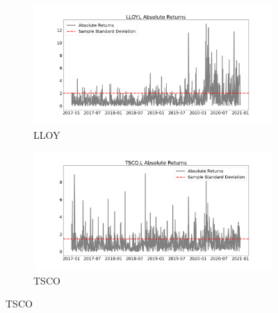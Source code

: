 \begin{figure}[hbt!]

\begin{subfigure}{.49\linewidth}
  \includegraphics[width=\linewidth]{images/Exploratory/plot 1.png}
  \caption{LLOY}
  \label{A}
\end{subfigure} %
\begin{subfigure}{.49\linewidth}
  \includegraphics[width=\linewidth]{images/Exploratory/plot 2.png}
  \caption{TSCO}
  \label{B}
\end{subfigure}


\end{figure}
